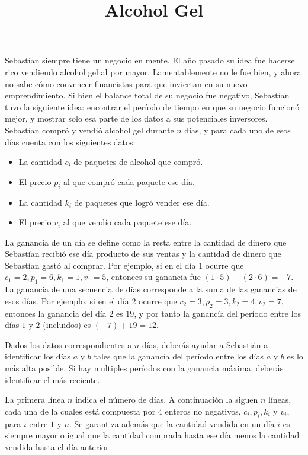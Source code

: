 \documentclass{oci}
\title{Alcohol Gel}
\begin{document}
\begin{problemDescription}
Sebastían siempre tiene un negocio en mente. El año pasado su idea fue hacerse rico vendiendo alcohol gel al por mayor. Lamentablemente no le fue bien, y ahora no sabe cómo convencer financistas para que inviertan en su nuevo emprendimiento.
 Si bien el balance total de su negocio fue negativo, Sebastían tuvo la siguiente idea: encontrar el período de tiempo en que su negocio funcionó mejor, y mostrar solo esa parte de los datos a sus potenciales inversores. 
Sebastían compró y vendió alcohol gel durante $n$ días, y para cada uno de esos días cuenta con los siguientes datos:
\begin{itemize}
	\item La cantidad $c_i$ de paquetes de alcohol que compró. 
	\item El precio $p_i$ al que compró cada paquete ese día.
	\item La cantidad $k_i$ de paquetes que logró vender ese día.
	\item El precio $v_i$ al que vendío cada paquete ese día.
\end{itemize}

La ganancia de un día se define como la resta entre la cantidad de dinero que Sebastían recibió ese día producto de sus ventas y la cantidad de dinero que Sebastían gastó al comprar. Por ejemplo, si en el día $1$ ocurre que $c_1 = 2, p_1 = 6, k_1=1, v_1=5$, entonces su ganancia fue $(1 \cdot 5) - (2 \cdot 6) = -7$.
 La ganancia de una secuencia de días corresponde a la suma de las ganancias de esos días. Por ejemplo, si en el día $2$ ocurre que $c_2 = 3, p_2 = 3, k_2=4, v_2=7$, entonces la ganancia del día $2$ es $19$, y por tanto la ganancía del período entre los días $1$ y $2$ (incluidos) es $(-7) + 19 = 12$.

Dados los datos correspondientes a $n$ días, deberás ayudar a Sebastián a identificar los días $a$ y $b$ tales que la ganancía del período entre los días $a$ y $b$ es lo más alta posible. Si hay multiples períodos con la ganancia máxima, deberás identificar el más reciente.

\end{problemDescription}

\begin{inputDescription}
La primera línea $n$ indica el número de días. A continuación la siguen $n$ líneas, cada una de la cuales está compuesta por $4$ enteros no negativos, $c_i, p_i, k_i$ y $v_i$, para $i$ entre $1$ y $n$. Se garantiza además que la cantidad vendida en un día $i$ 
es siempre mayor o igual que la cantidad comprada hasta ese día menos la cantidad vendida hasta el día anterior.
\end{inputDescription}
\end{document}
